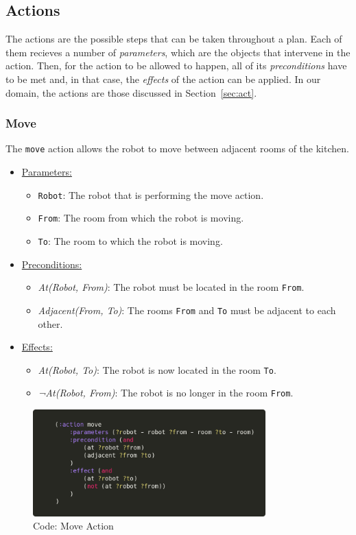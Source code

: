 \documentclass{article}
\begin{document}
\subsection{Actions}
The actions are the possible steps that can be taken throughout a plan. Each of them recieves a number of \textit{parameters}, which are the objects that intervene in the action. Then, for the action to be allowed to happen, all of its \textit{preconditions} have to be met and, in that case, the \textit{effects} of the action can be applied. In our domain, the actions are those discussed in Section~\ref{sec:act}.
\subsubsection{Move}
The \texttt{move} action allows the robot to move between adjacent rooms of the kitchen.
\begin{itemize}
    \item \underline{Parameters:}
    \begin{itemize}
        \item \texttt{Robot}: The robot that is performing the move action.
        \item \texttt{From}: The room from which the robot is moving.
        \item \texttt{To}: The room to which the robot is moving.
    \end{itemize}
    \item \underline{Preconditions:}
    \begin{itemize}
        \item \textit{At(Robot, From)}: The robot must be located in the room \texttt{From}.
        \item \textit{Adjacent(From, To)}: The rooms \texttt{From} and \texttt{To} must be adjacent to each other.
    \end{itemize}
    \item \underline{Effects:}
    \begin{itemize}
        \item \textit{At(Robot, To)}: The robot is now located in the room \texttt{To}.
        \item \textit{¬At(Robot, From)}: The robot is no longer in the room \texttt{From}.
    \end{itemize}
\end{itemize}
\begin{figure}[ht]
    \centering
    \includegraphics[width=0.80\textwidth]{assets/move.png}
    \caption{Code: Move Action}
    \label{fig:act:move}
\end{figure}
\end{document}
